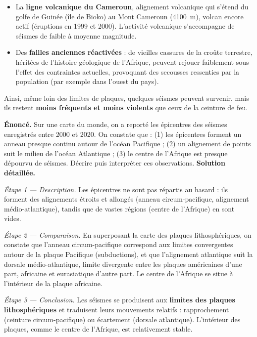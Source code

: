 \documentclass[11pt]{article}
\begin{document}
\begin{itemize}
\item La \textbf{ligne volcanique du Cameroun}, alignement volcanique qui s'étend du golfe de Guinée (île de Bioko) au Mont Cameroun (\SI{4100}{m}), volcan encore actif (éruptions en 1999 et 2000). L'activité volcanique s'accompagne de séismes de faible à moyenne magnitude.
\item Des \textbf{failles anciennes réactivées} : de vieilles cassures de la croûte terrestre, héritées de l'histoire géologique de l'Afrique, peuvent rejouer faiblement sous l'effet des contraintes actuelles, provoquant des secousses ressenties par la population (par exemple dans l'ouest du pays).
\end{itemize}

Ainsi, même loin des limites de plaques, quelques séismes peuvent survenir, mais ils restent \textbf{moins fréquents et moins violents} que ceux de la ceinture de feu.

\begin{exoresolu}
\textbf{Énoncé.} Sur une carte du monde, on a reporté les épicentres des séismes enregistrés entre 2000 et 2020. On constate que : (1) les épicentres forment un anneau presque continu autour de l'océan Pacifique ; (2) un alignement de points suit le milieu de l'océan Atlantique ; (3) le centre de l'Afrique est presque dépourvu de séismes. Décrire puis interpréter ces observations.
\tcblower
\textbf{Solution détaillée.}

\emph{Étape 1 — Description.} Les épicentres ne sont pas répartis au hasard : ils forment des alignements étroits et allongés (anneau circum-pacifique, alignement médio-atlantique), tandis que de vastes régions (centre de l'Afrique) en sont vides.

\emph{Étape 2 — Comparaison.} En superposant la carte des plaques lithosphériques, on constate que l'anneau circum-pacifique correspond aux limites convergentes autour de la plaque Pacifique (subductions), et que l'alignement atlantique suit la dorsale médio-atlantique, limite divergente entre les plaques américaines d'une part, africaine et eurasiatique d'autre part. Le centre de l'Afrique se situe à l'intérieur de la plaque africaine.

\emph{Étape 3 — Conclusion.} Les séismes se produisent aux \textbf{limites des plaques lithosphériques} et traduisent leurs mouvements relatifs : rapprochement (ceinture circum-pacifique) ou écartement (dorsale atlantique). L'intérieur des plaques, comme le centre de l'Afrique, est relativement stable.
\end{exoresolu}
\end{document}

